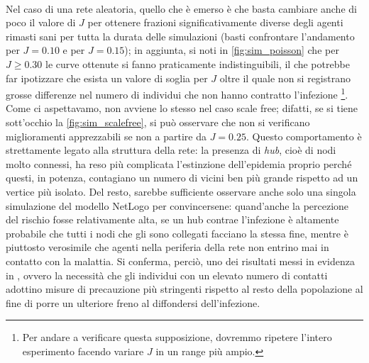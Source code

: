 \\Nel caso di una rete aleatoria, quello che è emerso è che basta cambiare anche di poco il valore di $ J $ per ottenere frazioni significativamente diverse degli agenti rimasti sani per tutta la durata delle simulazioni (basti confrontare l'andamento per $ J = 0.10 $ e per $ J = 0.15 $); in aggiunta, si noti  in \cref{fig:sim_poisson} che per $ J \geq 0.30 $ le curve ottenute si fanno praticamente indistinguibili, il che potrebbe far ipotizzare che esista un valore di soglia per $ J $ oltre il quale non si registrano grosse differenze nel numero di individui che non hanno contratto l'infezione \footnote{Per andare a verificare questa supposizione, dovremmo ripetere l'intero esperimento facendo variare $ J $ in un range più ampio.}. \\Come ci aspettavamo, non avviene lo stesso nel caso scale free; difatti, se si tiene sott'occhio la \cref{fig:sim_scalefree}, si può osservare che non si verificano miglioramenti apprezzabili se non a partire da $ J = 0.25 $. Questo comportamento è strettamente legato alla struttura della rete: la presenza di \emph{hub}, cioè di nodi molto connessi, ha reso più complicata l'estinzione dell'epidemia proprio perché questi, in potenza, contagiano un numero di vicini ben più grande rispetto ad un vertice più isolato. Del resto, sarebbe sufficiente osservare anche solo una singola simulazione del modello NetLogo per convincersene: quand'anche la percezione del rischio fosse relativamente alta, se un hub contrae l'infezione è altamente probabile che tutti i nodi che gli sono collegati facciano la stessa fine, mentre è piuttosto verosimile che agenti nella periferia della rete non entrino mai in contatto con la malattia. Si conferma, perciò, uno dei risultati messi in evidenza in \cite{Bagnoli2007}, ovvero la necessità che gli individui con un elevato numero di contatti adottino misure di precauzione più stringenti rispetto al resto della popolazione al fine di porre un ulteriore freno al diffondersi dell'infezione.